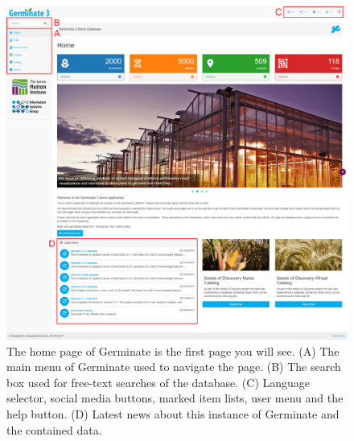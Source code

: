 \begin{figure}
	\centering
	\includegraphics[width=0.85\linewidth]{img/overview/home.png}
	\caption{The home page of Germinate is the first page you will see. (A) The main menu of Germinate used to navigate the page. (B) The search box used for free-text searches of the database. (C) Language selector, social media buttons, marked item lists, user menu and the help button. (D) Latest news about this instance of Germinate and the contained data.}
	\label{fig:overview:home}
\end{figure}